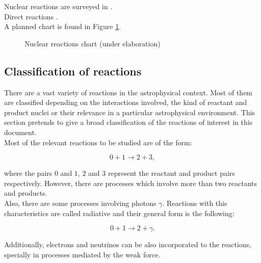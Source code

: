 \documentclass[openany]{book}
\begin{document}
Nuclear reactions are surveyed in \cite{bertulani_2003}. \\

Direct reactions \cite{bertulani_bonaccorso_2022}. \\

A planned chart is found in Figure \ref{fig.nuclerReactionChains}.


\begin{figure}[H]
	
	\caption[Nuclear reactions chart]{Nuclear reactions chart (under elaboration)}
	\label{fig.nuclerReactionChains}
\end{figure}

\subsection{Classification of reactions} \label{sub:classificationReactions}

There are a vast variety of reactions in the astrophysical context. Most of them are classified depending on the interactions involved, the kind of reactant and product nuclei or their relevance in a particular astrophysical environment. This section pretends to give a broad classification of the reactions of interest in this document.\\ 

Most of the relevant reactions to be studied are of the form: 

\begin{equation} \label{eq:nuclearReaction_general}
	0 + 1 \rightarrow 2 + 3,
\end{equation}

where the pairs $0$ and $1$, $2$ and $3$ represent the reactant and product pairs respectively. However, there are processes which involve more than two reactants and products. \\

Also, there are some processes involving photons $\gamma$. Reactions with this characteristics are called radiative and their general form is the following:

\begin{equation} \label{eq:nuclearReaction_gammaCapture}
		0 + 1 \rightarrow 2 + \gamma.
\end{equation}

Additionally, electrons and neutrinos can be also incorporated to the reactions, specially in processes mediated by the weak force.  \\
\end{document}
